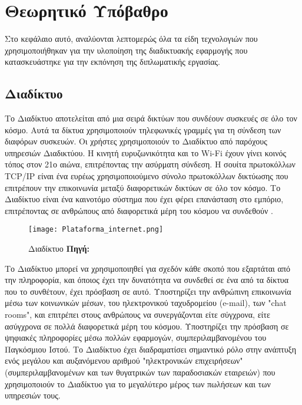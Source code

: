\chapter{Θεωρητικό Υπόβαθρο}
Στο κεφάλαιο αυτό, αναλύονται λεπτομερώς όλα τα είδη τεχνολογιών που χρησιμοποιήθηκαν για την υλοποίηση της διαδικτυακής εφαρμογής που κατασκευάστηκε για την εκπόνηση της διπλωματικής εργασίας.

\section{Διαδίκτυο}
Το Διαδίκτυο αποτελείται από μια σειρά δικτύων που συνδέουν συσκευές σε όλο τον κόσμο. Αυτά τα δίκτυα χρησιμοποιούν τηλεφωνικές γραμμές για τη σύνδεση των διαφόρων συσκευών. Οι χρήστες χρησιμοποιούν το Διαδίκτυο από παρόχους υπηρεσιών Διαδικτύου. Η κινητή ευρυζωνικότητα και το Wi-Fi έχουν γίνει κοινός τόπος στον 21ο αιώνα, επιτρέποντας την ασύρματη σύνδεση. Η σουίτα πρωτοκόλλων TCP/IP είναι ένα ευρέως χρησιμοποιούμενο σύνολο πρωτοκόλλων δικτύωσης που επιτρέπουν την επικοινωνία μεταξύ διαφορετικών δικτύων σε όλο τον κόσμο. Το Διαδίκτυο είναι ένα καινοτόμο σύστημα που έχει φέρει επανάσταση στο εμπόριο, επιτρέποντας σε ανθρώπους από διαφορετικά μέρη του κόσμου να συνδεθούν \cite{internet_britannica}.

\begin{figure}[h]
	\centering
	\texttt{[image: Plataforma\_internet.png]}
	\caption[{Διαδίκτυο}]{Διαδίκτυο \textbf{Πηγή:} \cite{fig_Plataforma_internet}}
	\label{fig:Plataforma_internet}
\end{figure}

Το Διαδίκτυο μπορεί να χρησιμοποιηθεί για σχεδόν κάθε σκοπό που εξαρτάται από την πληροφορία, και όποιος έχει την δυνατότητα να συνδεθεί σε ένα από τα δίκτυα που το συνθέτουν, έχει πρόσβαση σε αυτό. Υποστηρίζει την ανθρώπινη επικοινωνία μέσω των κοινωνικών μέσων, του ηλεκτρονικού ταχυδρομείου (e-mail), των "chat rooms", και επιτρέπει στους ανθρώπους να συνεργάζονται είτε σύγχρονα, είτε ασύγχρονα σε πολλά διαφορετικά μέρη του κόσμου. Υποστηρίζει την πρόσβαση σε ψηφιακές πληροφορίες μέσω πολλών εφαρμογών, συμπεριλαμβανομένου του Παγκόσμιου Ιστού. Το Διαδίκτυο έχει διαδραματίσει σημαντικό ρόλο στην ανάπτυξη ενός μεγάλου και αυξανόμενου αριθμού "ηλεκτρονικών επιχειρήσεων" (συμπεριλαμβανομένων και των θυγατρικών των παραδοσιακών εταιρειών) που χρησιμοποιούν το Διαδίκτυο για το μεγαλύτερο μέρος των πωλήσεων και των υπηρεσιών τους.

